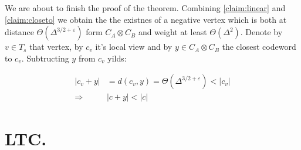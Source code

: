  We are about to finish the proof of the theorem. Combining \cref{claim:linear} and \cref{claim:closeto} we obtain the the existnes of a negative vertex which is both at distance $\Theta\left(\Delta^{3/2 + \varepsilon}\right)$ form $C_{A}\otimes C_{B}$ and weight at least $\Theta\left( \Delta^{2} \right)$. Denote by $v \in T_{s}$ that vertex, by $c_{v}$ it's local view and by $y \in C_{A}\otimes C_{B}$ the closest codeword to $c_{v}$. Subtructing $y$ from $c_{v}$ yilds: 
 
 \begin{equation*}
   \begin{split}
     \left|   c_{v} + y   \right| &= d\left( c_{v}, y  \right) = \Theta\left( \Delta^{3/2 + \varepsilon} \right) < \left|   c_{v}   \right|     \\
     \Rightarrow & | c + y| < |c| 
   \end{split}
 \end{equation*}

 \section{LTC.}




